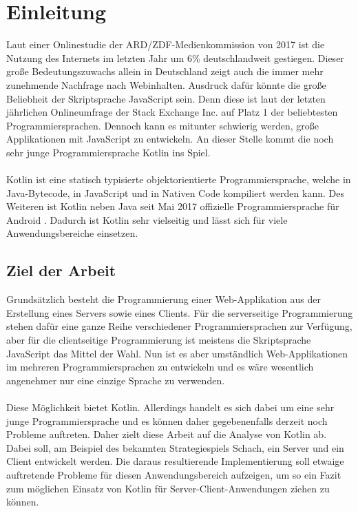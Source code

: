
\chapter{Einleitung}
Laut einer Onlinestudie der ARD/ZDF-Medienkommission von 2017 \cite{onlineStudy2017,resultsOnlineStudy2017} ist die Nutzung des Internets im letzten Jahr um 6\% deutschlandweit gestiegen. Dieser große Bedeutungszuwachs allein in Deutschland zeigt auch die immer mehr zunehmende Nachfrage nach Webinhalten. Ausdruck dafür könnte die große Beliebheit der Skriptsprache JavaScript sein. Denn diese ist laut der letzten jährlichen Onlineumfrage der Stack Exchange Inc. \cite{developerSurvey2017} auf Platz 1 der beliebtesten Programmiersprachen. Dennoch kann es mitunter schwierig werden, große Applikationen mit JavaScript zu entwickeln. An dieser Stelle kommt die noch sehr junge Programmiersprache Kotlin ins Spiel.\\
\\
Kotlin ist eine statisch typisierte objektorientierte Programmiersprache, welche in Java-Bytecode, in JavaScript und in Nativen Code kompiliert werden kann. Des Weiteren ist Kotlin neben Java seit Mai 2017 offizielle Programmiersprache für Android \cite{kotlinAndroidOfficial}. Dadurch ist Kotlin sehr vielseitig und lässt sich für viele Anwendungsbereiche einsetzen.

\section{Ziel der Arbeit}
Grundsätzlich besteht die Programmierung einer Web-Applikation aus der Erstellung eines Servers sowie eines Clients. Für die serverseitige Programmierung stehen dafür eine ganze Reihe verschiedener Programmiersprachen zur Verfügung, aber für die clientseitige Programmierung ist meistens die Skriptsprache JavaScript das Mittel der Wahl. Nun ist es aber umständlich Web-Applikationen im mehreren Programmiersprachen zu entwickeln und es wäre wesentlich angenehmer nur eine einzige Sprache zu verwenden.\\
\\
Diese Möglichkeit bietet Kotlin. Allerdings handelt es sich dabei um eine sehr junge Programmiersprache und es können daher gegebenenfalls derzeit noch Probleme auftreten. Daher zielt diese Arbeit auf die Analyse von Kotlin ab. Dabei soll, am Beispiel des bekannten Strategiespiels Schach, ein Server und ein Client entwickelt werden. Die daraus resultierende Implementierung soll etwaige auftretende Probleme für diesen Anwendungsbereich aufzeigen, um so ein Fazit zum möglichen Einsatz von Kotlin für Server-Client-Anwendungen ziehen zu können.

